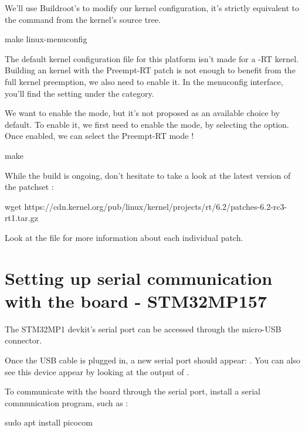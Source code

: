 We'll use Buildroot's  to modify our kernel configuration,
it's strictly equivalent to the  command from the kernel's source tree.

\begin{bashinput}
	make linux-menuconfig
\end{bashinput}

The default kernel configuration file for this platform isn't made for a -RT kernel. Building an kernel with the Preempt-RT patch is not enough to
benefit from the full kernel preemption, we also need to enable it. In the menuconfig interface, you'll find the  setting under the  category.

We want to enable the  mode, but it's not proposed as an available choice by default. To enable it, we first need to enable the  mode, by selecting the  option. Once enabled, we can select the Preempt-RT mode !

\begin{bashinput}
make
\end{bashinput}

While the build is ongoing, don't hesitate to take a look at the latest
version of the patchset :

\begin{bashinput}
wget https://cdn.kernel.org/pub/linux/kernel/projects/rt/6.2/patches-6.2-rc3-rt1.tar.gz
\end{bashinput}

Look at the  file for more information about each individual patch.

\section{Setting up serial communication with the board - STM32MP157}

The STM32MP1 devkit's serial port can be accessed through the micro-USB connector.

Once the USB cable is plugged in, a new serial port
should appear: .  You can also see this device
appear by looking at the output of .

To communicate with the board through the serial port, install a
serial communication program, such as :

\begin{bashinput}
sudo apt install picocom
\end{bashinput}

